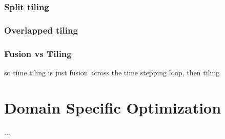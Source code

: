 \subsubsection{Split tiling}


\subsubsection{Overlapped tiling}
 
 \subsubsection{Fusion vs Tiling}
 \label{sec:bkg:sparsetiling}
 so time tiling is just fusion across the time stepping loop, then tiling



\section{Domain Specific Optimization}
...

